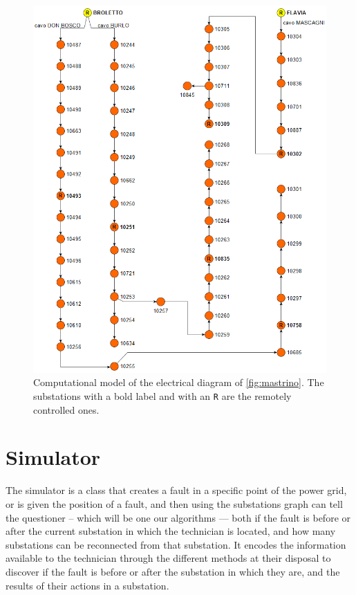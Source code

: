 \begin{figure}[htbp]
    \centering
    \includegraphics[scale=0.75]{chapters/figures/Substations_graph.PNG}
    \caption{Computational model of the electrical diagram of \autoref{fig:mastrino}. The substations with a bold label and with an \texttt{R} are the remotely controlled ones.}
    \label{fig:substations-graph}
\end{figure}


\section{Simulator}

The simulator is a class that creates a fault in a specific point of the power grid, or is given the position of a fault, and then using the substations graph can tell the questioner -- which will be one our algorithms --- both if the fault is before or after the current substation in which the technician is located, and how many substations can be reconnected from that substation. It encodes the information available to the technician through the different methods at their disposal to discover if the fault is before or after the substation in which they are, and the results of their actions in a substation.

